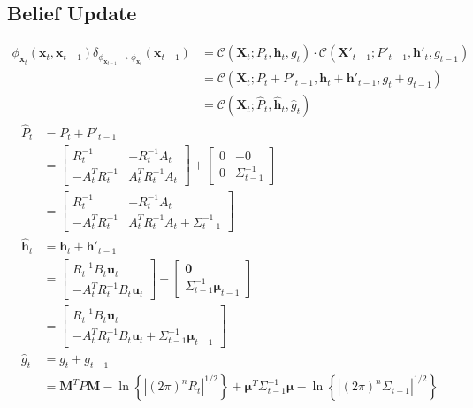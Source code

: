  
\subsection{Belief Update}
\label{section:belief_update}

\begin{align}
\phi_{\pmb{x}_{t}}(\pmb{x}_{t}, \pmb{x}_{t-1})  \delta_{\phi_{\pmb{x}_{t-1}} \rightarrow \phi_{\pmb{x}_{t}}} (\pmb{x}_{t-1}) &= 
\mathcal{C} \left( \pmb{X}_t ; P_t, \pmb{h}_{t}, g_{t} \right) \cdot \mathcal{C} \left( \pmb{X}'_{t-1}; P'_{t-1}, \pmb{h}'_{t}, g_{t-1} \right) \nonumber \\
&= \mathcal{C} \left( \pmb{X}_{t}; P_{t} + P'_{t-1}, \pmb{h}_{t} + \pmb{h}'_{t-1}, g_{t} + g_{t-1} \right) \nonumber \\
&= \mathcal{C} \left( \pmb{X}_{t}; \hat{P}_{t}, \hat{\pmb{h}}_{t}, \hat{g}_{t} \right) 
\end{align}
\begin{align}
\hat{P}_{t} &= P_{t} + P'_{t-1} \nonumber  \\ 
&=  \begin{bmatrix} R_{t}^{-1} & -R_{t}^{-1} A_{t} \\ -A_{t}^{T} R_{t}^{-1} & A_{t}^{T} R_{t}^{-1} A_{t} \end{bmatrix} +  \begin{bmatrix} 0 & -0 \\ 0 &  \Sigma^{-1}_{t-1} \end{bmatrix} \nonumber \\
&= \begin{bmatrix} R_{t}^{-1} & -R_{t}^{-1} A_{t} \\ -A_{t}^{T} R_{t}^{-1} & A_{t}^{T} R_{t}^{-1} A_{t} +  \Sigma^{-1}_{t-1} \end{bmatrix} \\
\hat{\pmb{h}}_{t} &= \pmb{h}_t + \pmb{h}'_{t-1} \nonumber \\
&= \begin{bmatrix} R_{t}^{-1} B_{t} \pmb{u}_{t} \\ - A_{t}^{T} R_{t}^{-1} B_{t} \pmb{u}_{t}  \end{bmatrix} + \begin{bmatrix} \pmb{0} \\ \Sigma_{t-1}^{-1} \pmb{\mu}_{t-1} \end{bmatrix} \nonumber \\
&= \begin{bmatrix} R_{t}^{-1} B_{t} \pmb{u}_{t} \\ - A_{t}^{T} R_{t}^{-1} B_{t} \pmb{u}_{t} + \Sigma_{t-1}^{-1} \pmb{\mu}_{t-1} \end{bmatrix} \\
\hat{g}_{t} &= g_{t} + g_{t-1} \nonumber \\
&=  \pmb{M}^{T} P \pmb{M} - \ln{ \left\{ | (2 \pi)^{n} R_{t} |^{1/2} \right\} } + \pmb{\mu}^{T} \Sigma_{t-1}^{-1} \pmb{\mu} -\ln{ \left\{ | (2 \pi)^{n} \Sigma_{t-1} |^{1/2} \right\} }
\end{align}

